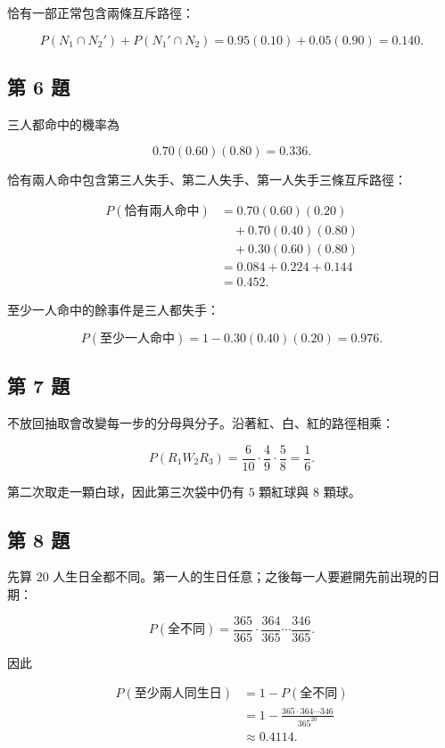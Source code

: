 \documentclass[11pt,a4paper]{article}
\begin{document}
恰有一部正常包含兩條互斥路徑：

\[
P(N_1\cap N_2')+P(N_1'\cap N_2)
=0.95(0.10)+0.05(0.90)
=\boxed{0.140}.
\]

\subsection{第 6 題}\label{ux7b2c-6-ux984c}

三人都命中的機率為

\[
0.70(0.60)(0.80)=\boxed{0.336}.
\]

恰有兩人命中包含第三人失手、第二人失手、第一人失手三條互斥路徑：

\[
\begin{aligned}
P(\text{恰有兩人命中})
&=0.70(0.60)(0.20)\\
&\quad+0.70(0.40)(0.80)\\
&\quad+0.30(0.60)(0.80)\\
&=0.084+0.224+0.144\\
&=\boxed{0.452}.
\end{aligned}
\]

至少一人命中的餘事件是三人都失手：

\[
P(\text{至少一人命中})
=1-0.30(0.40)(0.20)
=\boxed{0.976}.
\]

\subsection{第 7 題}\label{ux7b2c-7-ux984c}

不放回抽取會改變每一步的分母與分子。沿著紅、白、紅的路徑相乘：

\[
P(R_1W_2R_3)
=\frac6{10}\cdot\frac4{9}\cdot\frac5{8}
=\boxed{\frac16}.
\]

第二次取走一顆白球，因此第三次袋中仍有 \(5\) 顆紅球與 \(8\) 顆球。

\subsection{第 8 題}\label{ux7b2c-8-ux984c}

先算 \(20\) 人生日全都不同。第一人的生日任意；之後每一人要避開先前出現的日期：

\[
P(\text{全不同})
=\frac{365}{365}\cdot\frac{364}{365}\cdots\frac{346}{365}.
\]

因此

\[
\begin{aligned}
P(\text{至少兩人同生日})
&=1-P(\text{全不同})\\
&=1-\frac{365\cdot364\cdots346}{365^{20}}\\
&\approx\boxed{0.4114}.
\end{aligned}
\]
\end{document}
